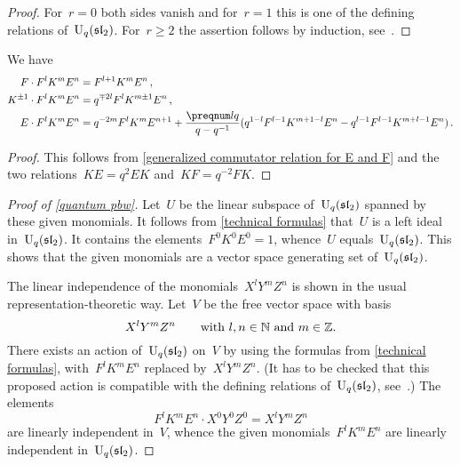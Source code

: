 \documentclass[a4paper, 11pt, oneside]{scrartcl}
\begin{document}
\begin{proof}
  For~$r = 0$ both sides vanish and for~$r = 1$ this is one of the defining relations of~$\operatorname{U}_q(\mathfrak{sl}_2)$.
  For~$r \geq 2$ the assertion follows by induction, see~\cite[Appendix 1.3~(5)]{jantzen_quantum}.
\end{proof}

\begin{corollary}
  \label{technical formulas}
  We have
  \begin{align*}
    F \cdot F^l K^m E^n
    &=
    F^{l+1} K^m E^n \,,
    \\
    K^{\pm 1} \cdot F^l K^m E^n
    &=
    q^{\mp 2l} F^l K^{m \pm 1} E^n \,,
    \\
    E \cdot F^l K^m E^n
    &=
    q^{-2m} F^l K^m E^{n+1}
    +
    \frac{\qnum{l}}{q - q^{-1}}
    (
      q^{1-l} F^{l-1} K^{m + 1-l} E^n
      -
      q^{l-1} F^{l-1} K^{m + l-1} E^n
    ) \,.
  \end{align*}
\end{corollary}

\begin{proof}
  This follows from \cref{generalized commutator relation for E and F} and the two relations~$KE = q^2 EK$ and~$KF = q^{-2} FK$.
\end{proof}

\begin{proof}[Proof of \cref{quantum pbw}]
  Let~$U$ be the linear subspace of~$\operatorname{U}_q(\mathfrak{sl}_2)$ spanned by these given monomials. 
  It follows from \cref{technical formulas} that~$U$ is a left ideal in~$\operatorname{U}_q(\mathfrak{sl}_2)$.
  It contains the elements~$F^0 K^0 E^0 = 1$, whence~$U$ equals~$\operatorname{U}_q(\mathfrak{sl}_2)$.
  This shows that the given monomials are a vector space generating set of~$\operatorname{U}_q(\mathfrak{sl}_2)$.

  The linear independence of the monomials~$X^l Y^m Z^n$ is shown in the usual representation-theoretic way.
  Let~$V$ be the free vector space with basis
  \[
    X^l Y^m Z^n
    \qquad
    \text{with~$l, n \in \mathbb{N}$ and~$m \in \mathbb{Z}$}.
  \]
  There exists an action of~$\operatorname{U}_q(\mathfrak{sl}_2)$ on~$V$ by using the formulas from \cref{technical formulas}, with~$F^l K^m E^n$ replaced by~$X^l Y^m Z^n$.
  (It has to be checked that this proposed action is compatible with the defining relations of~$\operatorname{U}_q(\mathfrak{sl}_2)$, see~\cite[Appendix 1.5]{jantzen_quantum}.)
  The elements
  \[
    F^l K^m E^n \cdot X^0 Y^0 Z^0
    =
    X^l Y^m Z^n
  \]
  are linearly independent in~$V$, whence the given monomials~$F^l K^m E^n$ are linearly independent in~$\operatorname{U}_q(\mathfrak{sl}_2)$.
\end{proof}
\end{document}
